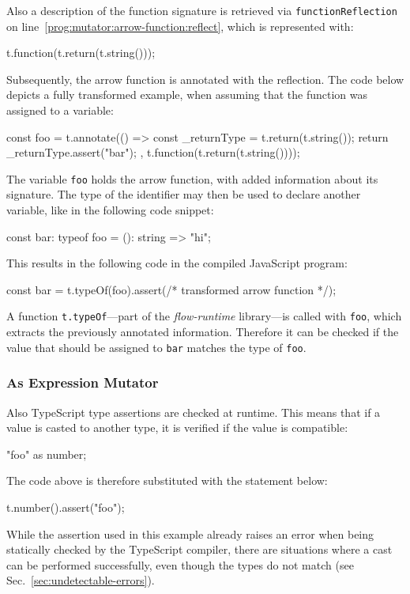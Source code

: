 Also a description of the function signature is retrieved via \texttt{functionReflection} on line~\ref{prog:mutator:arrow-function:reflect}, which is represented with:
\begin{JsCode}[numbers=none]
t.function(t.return(t.string()));
\end{JsCode}
Subsequently, the arrow function is annotated with the reflection. The code below depicts a fully transformed example, when assuming that the function was assigned to a variable:
\begin{JsCode}[numbers=none]
const foo = t.annotate(() => {
  const _returnType = t.return(t.string());
  return _returnType.assert("bar");
}, t.function(t.return(t.string())));
\end{JsCode}
The variable \texttt{foo} holds the arrow function, with added information about its signature. The type of the identifier may then be used to declare another variable, like in the following code snippet:
\begin{JsCode}[numbers=none]
const bar: typeof foo = (): string => "hi";
\end{JsCode}
This results in the following code in the compiled JavaScript program:
\begin{JsCode}[numbers=none]
const bar = t.typeOf(foo).assert(/* transformed arrow function */);
\end{JsCode}
A function \texttt{t.typeOf}---part of the \emph{flow-runtime} library---is called with \texttt{foo}, which extracts the previously annotated information. Therefore it can be checked if the value that should be assigned to \texttt{bar} matches the type of \texttt{foo}.

\subsubsection{As Expression Mutator}

Also TypeScript type assertions are checked at runtime. This means that if a value is casted to another type, it is verified if the value is compatible:
\begin{JsCode}[numbers=none]
"foo" as number;
\end{JsCode}
The code above is therefore substituted with the statement below:
\begin{JsCode}[numbers=none]
t.number().assert("foo");
\end{JsCode}
While the assertion used in this example already raises an error when being statically checked by the TypeScript compiler, there are situations where a cast can be performed successfully, even though the types do not match (see Sec.~\ref{sec:undetectable-errors}).

